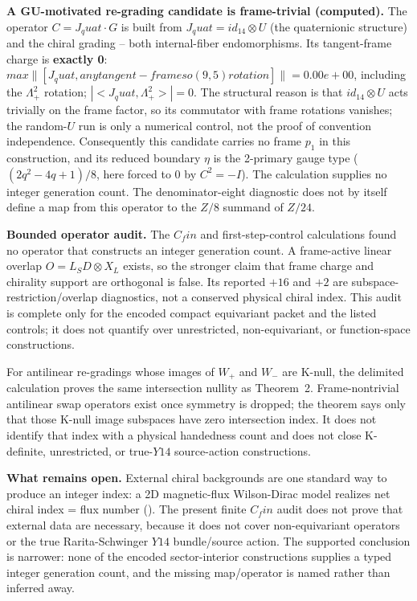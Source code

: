 \documentclass[11pt]{article}
\theoremstyle{remark}
\begin{document}
\textbf{A GU-motivated re-grading candidate is frame-trivial (computed).} The operator $C = J_quat \cdot G$ is built from $J_quat = id_14 \otimes U$ (the quaternionic structure) and the chiral grading -- both internal-fiber endomorphisms. Its tangent-frame charge is \textbf{exactly 0}: $max \lVert [J_quat, any tangent-frame so(9,5) rotation] \rVert = 0.00e+00$, including the $\Lambda^2_+$ rotation; $|<J_quat, \Lambda^2_+>| = 0$. The structural reason is that $id_14 \otimes U$ acts trivially on the frame factor, so its commutator with frame rotations vanishes; the random-$U$ run is only a numerical control, not the proof of convention independence. Consequently this candidate carries no frame $p_1$ in this construction, and its reduced boundary $\eta$ is the 2-primary gauge type ($(2q^2-4q+1)/8$, here forced to 0 by $C^2 = -I$). The calculation supplies no integer generation count. The denominator-eight diagnostic does not by itself define a map from this operator to the $Z/8$ summand of $Z/24$.

\textbf{Bounded operator audit.} The $C_fin$ and first-step-control calculations found no operator that constructs an integer generation count. A frame-active linear overlap $O = L_SD \otimes X_L$ exists, so the stronger claim that frame charge and chirality support are orthogonal is false. Its reported $+16$ and $+2$ are subspace-restriction/overlap diagnostics, not a conserved physical chiral index. This audit is complete only for the encoded compact equivariant packet and the listed controls; it does not quantify over unrestricted, non-equivariant, or function-space constructions.

For antilinear re-gradings whose images of $W_+$ and $W_-$ are K-null, the delimited calculation proves the same intersection nullity as Theorem~2. Frame-nontrivial antilinear swap operators exist once symmetry is dropped; the theorem says only that those K-null image subspaces have zero intersection index. It does not identify that index with a physical handedness count and does not close K-definite, unrestricted, or true-$Y14$ source-action constructions.

\textbf{What remains open.} External chiral backgrounds are one standard way to produce an integer index: a 2D magnetic-flux Wilson-Dirac model realizes net chiral index = flux number (). The present finite $C_fin$ audit does not prove that external data are necessary, because it does not cover non-equivariant operators or the true Rarita-Schwinger $Y14$ bundle/source action. The supported conclusion is narrower: none of the encoded sector-interior constructions supplies a typed integer generation count, and the missing map/operator is named rather than inferred away.
\end{document}
